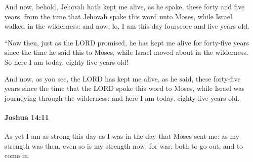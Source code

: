 			\begin{versebox}
					\item[BHS] 
					\item[ASV] And now, behold, Jehovah hath kept me alive, as he spake, these forty and five years, from the time that Jehovah spake this word unto Moses, while Israel walked in the wilderness: and now, lo, I am this day fourscore and five years old.
					\item[NIV] “Now then, just as the LORD promised, he has kept me alive for forty-five years since the time he said this to Moses, while Israel moved about in the wilderness. So here I am today, eighty-five years old!
					\item[NRSV] And now, as you see, the LORD has kept me alive, as he said, these forty-five years since the time that the LORD spoke this word to Moses, while Israel was journeying through the wilderness; and here I am today, eighty-five years old.
			\end{versebox}

		\paragraph{Joshua 14:11} %
			\label{JOSHUA-14-11}

			As yet I am as strong this day as I was in the day that Moses sent me: as my strength was then, even so is my strength now, for war, both to go out, and to come in.

